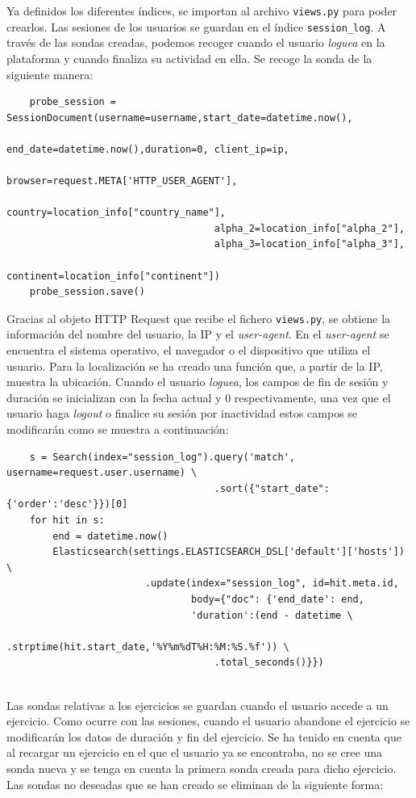 Ya definidos los diferentes índices, se importan al archivo \texttt{views.py} para poder crearlos. Las sesiones de los usuarios se guardan en el índice \texttt{session\_log}. A través de las sondas creadas, podemos recoger cuando el usuario \textit{loguea} en la plataforma y cuando finaliza su actividad en ella. Se recoge la sonda de la siguiente manera:
\\
{\footnotesize
\begin{verbatim}
    probe_session = SessionDocument(username=username,start_date=datetime.now(),
                                    end_date=datetime.now(),duration=0, client_ip=ip,
                                    browser=request.META['HTTP_USER_AGENT'],
                                    country=location_info["country_name"],
                                    alpha_2=location_info["alpha_2"], 
                                    alpha_3=location_info["alpha_3"],
                                    continent=location_info["continent"])
    probe_session.save()
\end{verbatim}
}
\newpage
Gracias al objeto HTTP Request que recibe el fichero \texttt{views.py}, se obtiene la información del nombre del usuario, la IP y el \textit{user-agent}. En el \textit{user-agent} se encuentra el sistema operativo, el navegador o el dispositivo que utiliza el usuario. Para la localización se ha creado una función que, a partir de la IP, muestra la ubicación. Cuando el usuario \textit{loguea}, los campos de fin de sesión y duración se inicializan con la fecha actual y 0 respectivamente, una vez que el usuario haga \textit{logout} o finalice su sesión por inactividad estos campos se modificarán como se muestra a continuación:\\
{\footnotesize
\begin{verbatim}
    s = Search(index="session_log").query('match', username=request.user.username) \
                                    .sort({"start_date": {'order':'desc'}})[0]
    for hit in s:
        end = datetime.now()
        Elasticsearch(settings.ELASTICSEARCH_DSL['default']['hosts']) \
                        .update(index="session_log", id=hit.meta.id,
                                body={"doc": {'end_date': end,
                                'duration':(end - datetime \
                                    .strptime(hit.start_date,'%Y%m%dT%H:%M:%S.%f')) \
                                    .total_seconds()}})
\end{verbatim}
}
\\
Las sondas relativas a los ejercicios se guardan cuando el usuario accede a un ejercicio. Como ocurre con las sesiones, cuando el usuario abandone el ejercicio se modificarán los datos de duración y fin del ejercicio. Se ha tenido en cuenta que al recargar un ejercicio en el que el usuario ya se encontraba, no se cree una sonda nueva y se tenga en cuenta la primera sonda creada para dicho ejercicio. Las sondas no deseadas que se han creado se eliminan de la siguiente forma:\\

